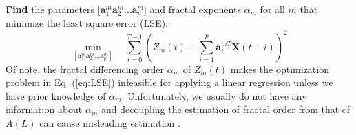 \textbf{Find} the parameters $[\textbf{a}_{1}^{m} \textbf{a}_{2}^{m}$...$\textbf{a}_{p}^{m}]$ and fractal exponents $\alpha_m$ for all $m$ that minimize the least square error (LSE):
\begin{equation}\label{eq:LSE}
\min\limits_{[\textbf{a}_{1}^{m} \textbf{a}_{2}^{m}...\textbf{a}_{p}^{m}]} \quad\sum_{i=0}^{T-1}(Z_m(t)-\sum_{i=1}^{p}\textbf{a}_{i}^{mT}\textbf{X}(t-i))^2
\end{equation}
\vskip -2mm
Of note, the fractal differencing order $\alpha_{m}$ of $Z_m(t)$ makes the optimization problem in Eq. (\ref{eq:LSE}) infeasible for applying a linear regression unless we have prior knowledge of $\alpha_m$. Unfortunately, we usually do not have any information about $\alpha_m$ and decoupling the estimation of fractal order from that of $A(L)$ can cause misleading estimation \cite{Sowell}. 

